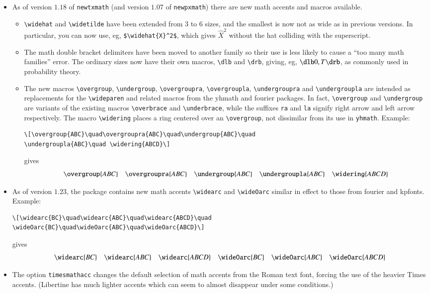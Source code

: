 \documentclass[\fsc]{article}
\theoremstyle{oldplain}
\theoremstyle{plain}
\begin{document}
\begin{itemize}
\item As of version $1.18$ of {\tt newtxmath} (and version $1.07$ of {\tt newpxmath}) there are new math accents and macros available.
\begin{itemize}
\item
\verb|\widehat| and \verb|\widetilde| have been extended from $3$ to $6$ sizes, and the smallest is now not as wide as in previous versions. In particular, you can now use, eg, \verb|$\widehat{X}^2$|, which gives $\widehat{X}^2$ without the hat colliding with the superscript.
\item The math double bracket delimiters have been moved to another family so their use is less likely to cause a ``too many math families'' error. The ordinary sizes now have their own macros, \verb|\dlb| and \verb|\drb|, giving, eg, $\dlb 0,T\drb$, as commonly used in probability theory.
\item The new macros \verb|\overgroup|, \verb|\undergroup|, \verb|\overgroupra|, \verb|\overgroupla|, \verb|\undergroupra| and \verb|\undergroupla| are intended as replacements for the \verb|\wideparen| and related macros from the \textsf{yhmath} and \textsf{fourier} packages. In fact, \verb|\overgroup| and \verb|\undergroup| are variants of the existing macros \verb|\overbrace| and \verb|\underbrace|, while the suffixes {\tt ra} and {\tt la} signify right arrow and left arrow respectively. The macro \verb|\widering| places a ring centered over an \verb|\overgroup|, not dissimilar from its use in {\tt yhmath}. Example:
\begin{verbatim}
\[\overgroup{ABC}\quad\overgroupra{ABC}\quad\undergroup{ABC}\quad
\undergroupla{ABC}\quad \widering{ABCD}\] 
\end{verbatim}
gives
\[\overgroup{ABC}\quad\overgroupra{ABC}\quad\undergroup{ABC}\quad\undergroupla{ABC}\quad\widering{ABCD}\] 
\end{itemize}
\item As of version $1.23$, the package contains new math accents \verb|\widearc| and \verb|\wideOarc| similar in effect to those from \textsf{fourier} and \textsf{kpfonts}. Example: 
\begin{verbatim}
\[\widearc{BC}\quad\widearc{ABC}\quad\widearc{ABCD}\quad
\wideOarc{BC}\quad\wideOarc{ABC}\quad\wideOarc{ABCD}\]
\end{verbatim}
gives
\[\widearc{BC}\quad\widearc{ABC}\quad\widearc{ABCD}\quad
\wideOarc{BC}\quad\wideOarc{ABC}\quad\wideOarc{ABCD}\]
\item The option {\tt timesmathacc} changes the default selection of math accents from the Roman text font, forcing the use of the heavier Times accents. (Libertine has much lighter accents which can seem to almost disappear under some conditions.) 
\end{itemize}
\bigskip
\end{document}
